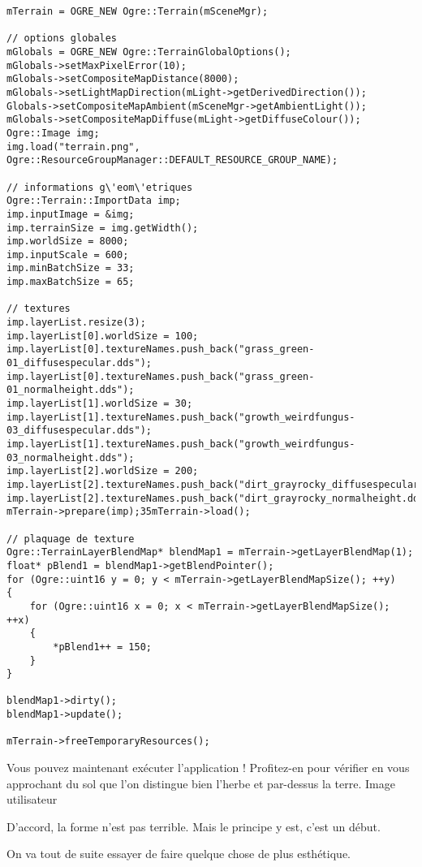 \documentclass[10pt,a4paper]{report}
\begin{document}
\begin{lstlisting}[caption={createTerrain (code complet)}]
mTerrain = OGRE_NEW Ogre::Terrain(mSceneMgr);

// options globales
mGlobals = OGRE_NEW Ogre::TerrainGlobalOptions();
mGlobals->setMaxPixelError(10);
mGlobals->setCompositeMapDistance(8000);
mGlobals->setLightMapDirection(mLight->getDerivedDirection());
Globals->setCompositeMapAmbient(mSceneMgr->getAmbientLight());
mGlobals->setCompositeMapDiffuse(mLight->getDiffuseColour());
Ogre::Image img;
img.load("terrain.png", Ogre::ResourceGroupManager::DEFAULT_RESOURCE_GROUP_NAME);

// informations g\'eom\'etriques
Ogre::Terrain::ImportData imp;
imp.inputImage = &img;
imp.terrainSize = img.getWidth();
imp.worldSize = 8000;
imp.inputScale = 600;
imp.minBatchSize = 33;
imp.maxBatchSize = 65;

// textures
imp.layerList.resize(3);
imp.layerList[0].worldSize = 100;
imp.layerList[0].textureNames.push_back("grass_green-01_diffusespecular.dds");
imp.layerList[0].textureNames.push_back("grass_green-01_normalheight.dds");
imp.layerList[1].worldSize = 30;
imp.layerList[1].textureNames.push_back("growth_weirdfungus-03_diffusespecular.dds");
imp.layerList[1].textureNames.push_back("growth_weirdfungus-03_normalheight.dds");
imp.layerList[2].worldSize = 200;
imp.layerList[2].textureNames.push_back("dirt_grayrocky_diffusespecular.dds");
imp.layerList[2].textureNames.push_back("dirt_grayrocky_normalheight.dds");
mTerrain->prepare(imp);35mTerrain->load();

// plaquage de texture
Ogre::TerrainLayerBlendMap* blendMap1 = mTerrain->getLayerBlendMap(1);
float* pBlend1 = blendMap1->getBlendPointer();
for (Ogre::uint16 y = 0; y < mTerrain->getLayerBlendMapSize(); ++y)
{
    for (Ogre::uint16 x = 0; x < mTerrain->getLayerBlendMapSize(); ++x)
    {
        *pBlend1++ = 150;
    }
}

blendMap1->dirty();
blendMap1->update();

mTerrain->freeTemporaryResources();
\end{lstlisting}

Vous pouvez maintenant ex\'ecuter l'application ! Profitez-en pour v\'erifier en vous approchant du sol que l'on distingue bien l'herbe et par-dessus la terre.
Image utilisateur


D'accord, la forme n'est pas terrible. Mais le principe y est, c'est un d\'ebut.

On va tout de suite essayer de faire quelque chose de plus esth\'etique.
\end{document}
